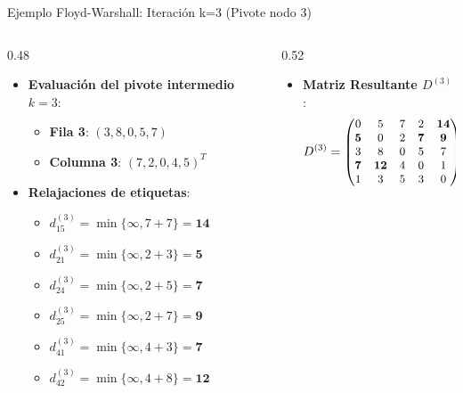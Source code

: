 \documentclass[
  ignorenonframetext,
]{beamer}
\providecommand{\tightlist}{%
  \setlength{\itemsep}{0pt}\setlength{\parskip}{0pt}}
\begin{document}
\begin{frame}{Ejemplo Floyd-Warshall: Iteración k=3 (Pivote nodo 3)}
\label{ejemplo-floyd-warshall-iteraciuxf3n-k3-pivote-nodo-3}
\begin{columns}[T]
\begin{column}{0.48\linewidth}
\begin{itemize}
\tightlist
\item
  \textbf{Evaluación del pivote intermedio \(k=3\)}:

  \begin{itemize}
  \tightlist
  \item
    \textbf{Fila 3}: \((3, 8, 0, 5, 7)\)
  \item
    \textbf{Columna 3}: \((7, 2, 0, 4, 5)^T\)
  \end{itemize}
\item
  \textbf{Relajaciones de etiquetas}:

  \begin{itemize}
  \tightlist
  \item
    \(d_{15}^{(3)} = \min \{\infty, 7 + 7\} = \mathbf{14}\)
  \item
    \(d_{21}^{(3)} = \min \{\infty, 2 + 3\} = \mathbf{5}\)
  \item
    \(d_{24}^{(3)} = \min \{\infty, 2 + 5\} = \mathbf{7}\)
  \item
    \(d_{25}^{(3)} = \min \{\infty, 2 + 7\} = \mathbf{9}\)
  \item
    \(d_{41}^{(3)} = \min \{\infty, 4 + 3\} = \mathbf{7}\)
  \item
    \(d_{42}^{(3)} = \min \{\infty, 4 + 8\} = \mathbf{12}\)
  \end{itemize}
\end{itemize}
\end{column}

\begin{column}{0.52\linewidth}
\begin{itemize}
\tightlist
\item
  \textbf{Matriz Resultante \(D^{(3)}\)}: \[ \small
  D^{(3)} = \begin{pmatrix}
  0 & 5 & 7 & 2 & \mathbf{14} \\
  \mathbf{5} & 0 & 2 & \mathbf{7} & \mathbf{9} \\
  3 & 8 & 0 & 5 & 7 \\
  \mathbf{7} & \mathbf{12} & 4 & 0 & 1 \\
  1 & 3 & 5 & 3 & 0
  \end{pmatrix}
  \]
\end{itemize}
\end{column}
\end{columns}
\end{frame}
\end{document}
